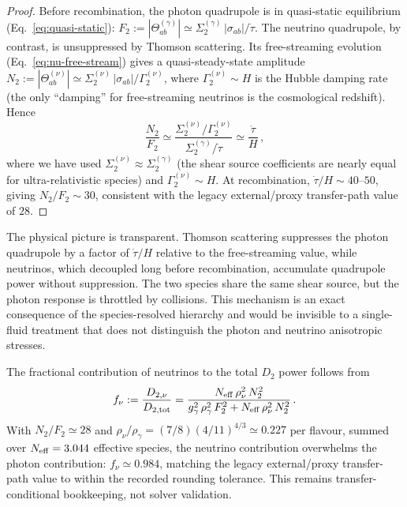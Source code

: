 \begin{proof}
Before recombination, the photon quadrupole is in
quasi-static equilibrium
(Eq.~\ref{eq:quasi-static}):
$F_2 := |\Theta^{(\gamma)}_{ab}|
\simeq \Sigma^{(\gamma)}_2\,
|\sigma_{ab}|/\dot{\tau}$.
The neutrino quadrupole, by contrast, is unsuppressed
by Thomson scattering.  Its free-streaming evolution
(Eq.~\ref{eq:nu-free-stream}) gives a
quasi-steady-state amplitude
$N_2 := |\Theta^{(\nu)}_{ab}|
\simeq \Sigma^{(\nu)}_2\,
|\sigma_{ab}|/\Gamma^{(\nu)}_2$,
where $\Gamma^{(\nu)}_2 \sim H$ is the Hubble damping
rate (the only ``damping'' for free-streaming
neutrinos is the cosmological redshift).  Hence
\begin{equation}\label{eq:ratio-derivation}
\frac{N_2}{F_2}
\simeq
\frac{\Sigma^{(\nu)}_2 / \Gamma^{(\nu)}_2}
     {\Sigma^{(\gamma)}_2 / \dot{\tau}}
\simeq
\frac{\dot{\tau}}{H}\,,
\end{equation}
where we have used $\Sigma^{(\nu)}_2 \approx
\Sigma^{(\gamma)}_2$ (the shear source coefficients
are nearly equal for ultra-relativistic species) and
$\Gamma^{(\nu)}_2 \sim H$.  At recombination,
$\dot{\tau}/H \sim 40$--$50$, giving
$N_2/F_2 \sim 30$, consistent with the legacy external/proxy
transfer-path value of $28$.
\end{proof}

The physical picture is transparent.  Thomson
scattering suppresses the photon quadrupole by a
factor of $\dot{\tau}/H$ relative to the free-streaming
value, while neutrinos, which decoupled long before
recombination, accumulate quadrupole power without
suppression.  The two species share the same shear
source, but the photon response is throttled by
collisions.  This mechanism is an exact consequence of
the species-resolved hierarchy and would be invisible
to a single-fluid treatment that does not distinguish
the photon and neutrino anisotropic stresses.

The fractional contribution of neutrinos to the total
$D_2$ power follows from
\begin{equation}\label{eq:nu-fraction}
f_\nu
:= \frac{D_{2,\nu}}{D_{2,\rm tot}}
= \frac{N_{\rm eff}\, \rho_\nu^2\, N_2^2}
       {g_\gamma^2\, \rho_\gamma^2\, F_2^2
        + N_{\rm eff}\, \rho_\nu^2\, N_2^2}\,.
\end{equation}
With $N_2/F_2 \simeq 28$ and
$\rho_\nu/\rho_\gamma = (7/8)(4/11)^{4/3}
\simeq 0.227$ per flavour, summed over
$N_{\rm eff} = 3.044$ effective species, the
neutrino contribution overwhelms the photon
contribution: $f_\nu \simeq 0.984$, matching the
legacy external/proxy transfer-path value to within
the recorded rounding tolerance.  This remains
transfer-conditional bookkeeping, not solver validation.


